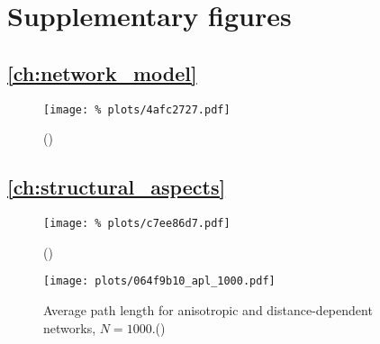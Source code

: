 





\section{Supplementary figures}\label{sec:supp_figures}

\subsection*{\autoref{ch:network_model}}

\begin{figure}[H]
  \centering
  \texttt{[image: \%
    plots/4afc2727.pdf]}
  \caption{()}
  \label{suppfig:rew_stats}
\end{figure}


\subsection*{\autoref{ch:structural_aspects}}

\begin{figure}[H]
  \centering
  \texttt{[image: \%
    plots/c7ee86d7.pdf]}
  \caption{()}
  \label{suppfig:out_degree}
\end{figure}


\begin{figure}[htp]
  \centering
  \texttt{[image: plots/064f9b10\_apl\_1000.pdf]}
  \caption{Average path length for anisotropic and distance-dependent
    networks, $N=1000$.()} %
  \label{suppfig:small_world}
\end{figure}





